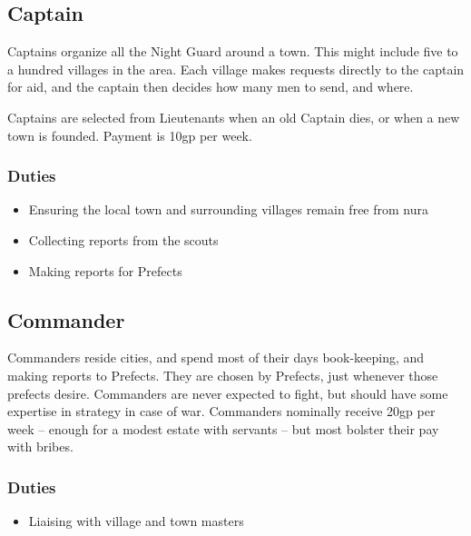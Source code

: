 \begin{multicols}{2}
\subsection{Captain}

Captains organize all the Night Guard around a town.
This might include five to a hundred villages in the area.
Each village makes requests directly to the captain for aid, and the captain then decides how many men to send, and where.

Captains are selected from Lieutenants when an old Captain dies, or when a new town is founded.
Payment is 10gp per week.

\subsubsection{Duties}

\begin{itemize}

	\item{Ensuring the local town and surrounding villages remain free from nura}
	\item{Collecting reports from the scouts}
	\item{Making reports for Prefects}

\end{itemize}

\subsection{Commander}

Commanders reside cities, and spend most of their days book-keeping, and making reports to Prefects.
They are chosen by Prefects, just whenever those prefects desire.
Commanders are never expected to fight, but should have some expertise in strategy in case of war.
Commanders nominally receive 20gp per week -- enough for a modest estate with servants -- but most bolster their pay with bribes.

\subsubsection{Duties}

\begin{itemize}

	\item{Liaising with village and town masters}

\end{itemize}


\end{multicols}
